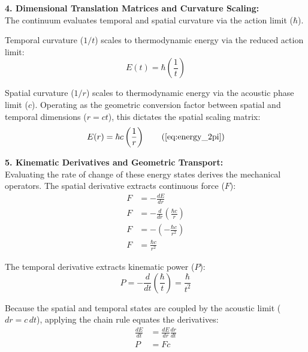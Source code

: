 \vspace{0.2 cm}

\textbf{4. Dimensional Translation Matrices and Curvature Scaling:} \\
The continuum evaluates temporal and spatial curvature via the action limit ($\hbar$).

Temporal curvature ($1/t$) scales to thermodynamic energy via the reduced action limit:
\begin{equation}
    E(t) = \hbar \left( \frac{1}{t} \right)
\end{equation}

Spatial curvature ($1/r$) scales to thermodynamic energy via the acoustic phase limit ($c$). Operating as the geometric conversion factor between spatial and temporal dimensions ($r = ct$), this dictates the spatial scaling matrix:
\begin{equation}
    E(r) = \hbar c \left( \frac{1}{r} \right) \tag{\ref{eq:energy_2pi}}
\end{equation}

\vspace{0.2 cm}



\textbf{5. Kinematic Derivatives and Geometric Transport:} \\
Evaluating the rate of change of these energy states derives the mechanical operators. The spatial derivative extracts continuous force ($F$):
\begin{align}
    F &= - \frac{dE}{dr} \nonumber \\
    F &= -\frac{d}{dr} \left( \frac{\hbar c}{r} \right) \nonumber \\
    F &= - \left( - \frac{\hbar c}{r^2} \right) \nonumber \\
    F &= \frac{\hbar c}{r^2} 
\end{align}

The temporal derivative extracts kinematic power ($P$):
\begin{equation}
    P = -\frac{d}{dt} \left( \frac{\hbar}{t} \right) = \frac{\hbar}{t^2}
\end{equation}

Because the spatial and temporal states are coupled by the acoustic limit ($dr = c \, dt$), applying the chain rule equates the derivatives:
\begin{align}
    \frac{dE}{dt} &= \frac{dE}{dr} \frac{dr}{dt} \nonumber \\
    P &= F c
\end{align}

